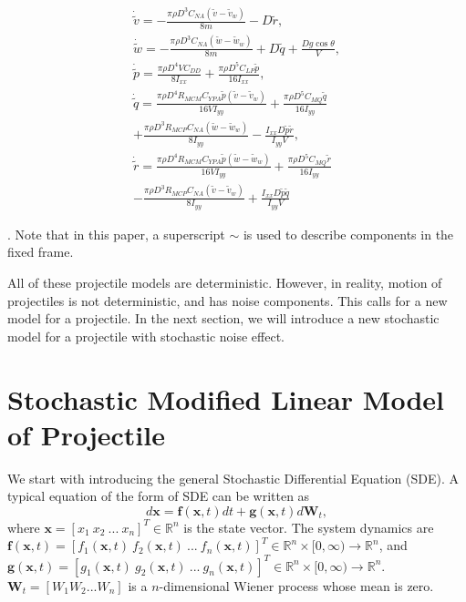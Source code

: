 \documentclass[letterpaper, 10 pt, conference]{ieeeconf}  %
\begin{document}
\begin{small}
\begin{gather}	
\dot{\tilde{v}}=-\frac{\pi \rho D^3 C_{NA} (\tilde{v} - \tilde{v}_w)}{8 m} - D \tilde{r}, \\
\dot{\tilde{w}}=-\frac{\pi \rho D^3 C_{NA} (\tilde{w} - \tilde{w}_w)}{8 m} + D \tilde{q} + \frac{D g \cos{\theta}}{V}, 
\\
\dot{\tilde{p}}=\frac{\pi \rho D^4 V C_{DD}}{8 I_{xx}} + \frac{\pi \rho D^5 C_{LP} \tilde{p}}{16 I_{xx}}, \\
\dot{\tilde{q}}=\frac{\pi \rho D^4 R_{MCM} C_{YPA} \tilde{p} (\tilde{v} -\tilde{v}_w)}{16 V I_{yy}} \nonumber + \frac{\pi \rho D^5 C_{MQ} \tilde{q}}{16 I_{yy}} \\ + \frac{\pi \rho D^3 R_{MCP} C_{NA} (\tilde{w} - \tilde{w}_w)}{8 I_{yy}} - \frac{I_{xx} D \tilde{p} \tilde{r}}{I_{yy} V}, \\
\dot{\tilde{r}}=\frac{\pi \rho D^4 R_{MCM} C_{YPA} \tilde{p} (\tilde{w} -\tilde{w}_w)}{16 V I_{yy}} \nonumber + \frac{\pi \rho D^5 C_{MQ} \tilde{r}}{16 I_{yy}}\\ - \frac{\pi \rho D^3 R_{MCP} C_{NA} (\tilde{v} - \tilde{v}_w)}{8 I_{yy}} + \frac{I_{xx} D \tilde{p} \tilde{q}}{I_{yy} V}
\end{gather} 
\end{small}
\cite{hainz2005modified}. 
Note that in this paper, a superscript $\sim$ is used to describe  components in the fixed frame.

All of these projectile models are deterministic. However, in reality, motion of projectiles is not deterministic, and has noise components. This calls for a new model for a projectile. In the next section, we will introduce a new stochastic model for a projectile with stochastic noise effect.

\section{Stochastic Modified Linear Model of Projectile}

We start with introducing the general Stochastic Differential Equation (SDE). A typical equation of the form of SDE can be written as   
\begin{equation}
d\boldsymbol{x}=\boldsymbol{f}(\boldsymbol{x},t)dt+\boldsymbol{g}(\boldsymbol{x},t)d\boldsymbol{W}_t,
\label{eqn:SDE}
\end{equation}
where $\boldsymbol{x}=[x_1 \ x_2 \ ... \ x_n]^T \in \mathbb{R}^n$ is the state vector. The system dynamics are $\boldsymbol{f}(\boldsymbol{x},t)=[f_1(\boldsymbol{x},t) \ f_2(\boldsymbol{x},t) \  ... \ f_n(\boldsymbol{x},t)]^T \in \mathbb{R}^n \times [0,\infty ) \rightarrow \mathbb{R}^n$, and $\boldsymbol{g}(\boldsymbol{x},t)=[g_1(\boldsymbol{x},t) \ g_2(\boldsymbol{x},t) \  ... \ g_n(\boldsymbol{x},t)]^T \in \mathbb{R}^n \times [0,\infty ) \rightarrow \mathbb{R}^n$. $\boldsymbol{W}_t=[W_1 W_2 ... W_n]$ is a $n$-dimensional Wiener process whose mean is zero. 
\end{document}
